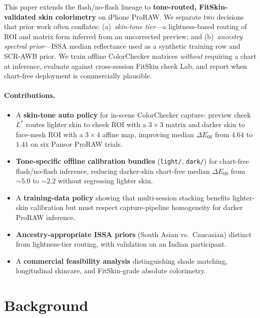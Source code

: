 \documentclass[11pt]{article}
\newcommand{\deee}{\ensuremath{\Delta E_{00}}}
\begin{document}
This paper extends the flash/no-flash lineage to \textbf{tone-routed, FitSkin-validated skin colorimetry} on iPhone ProRAW.
We separate two decisions that prior work often conflates: (a)~\emph{skin-tone tier}---a lightness-based routing of ROI and matrix form inferred from an uncorrected preview; and (b)~\emph{ancestry spectral prior}---ISSA median reflectance used as a synthetic training row and SCR-AWB prior.
We train offline ColorChecker matrices \emph{without} requiring a chart at inference, evaluate against cross-session FitSkin cheek Lab, and report when chart-free deployment is commercially plausible.

\paragraph{Contributions.}
\begin{itemize}[noitemsep]
  \item A \textbf{skin-tone auto policy} for in-scene ColorChecker capture: preview cheek $L^*$ routes lighter skin to cheek ROI with a $3\times3$ matrix and darker skin to face-mesh ROI with a $3\times4$ affine map, improving median $\deee$ from $4.64$ to $1.41$ on six Pansor ProRAW trials.
  \item \textbf{Tone-specific offline calibration bundles} (\texttt{light/}, \texttt{dark/}) for chart-free flash/no-flash inference, reducing darker-skin chart-free median $\deee$ from ${\sim}5.0$ to ${\sim}2.2$ without regressing lighter skin.
  \item A \textbf{training-data policy} showing that multi-session stacking benefits lighter-skin calibration but must respect capture-pipeline homogeneity for darker ProRAW inference.
  \item \textbf{Ancestry-appropriate ISSA priors} (South Asian vs.\ Caucasian) distinct from lightness-tier routing, with validation on an Indian participant.
  \item A \textbf{commercial feasibility analysis} distinguishing shade matching, longitudinal skincare, and FitSkin-grade absolute colorimetry.
\end{itemize}

\section{Background}\label{sec:background}
\end{document}
